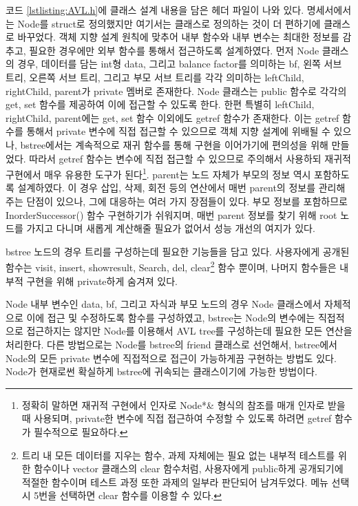 \documentclass{article}
\begin{document}
코드 \ref{lstlisting:AVL.h}에 클래스 설계 내용을 담은 헤더 파일이 나와 있다. 명세서에서는 Node를 struct로 정의했지만 여기서는 클래스로 정의하는 것이 더 편하기에 클래스로 바꾸었다. 객체 지향 설계 원칙에 맞추어 내부 함수와 내부 변수는 최대한 정보를 감추고, 필요한 경우에만 외부 함수를 통해서 접근하도록 설계하였다. 먼저 Node 클래스의 경우, 데이터를 담는 int형 data, 그리고 balance factor를 의미하는 bf, 왼쪽 서브 트리, 오른쪽 서브 트리, 그리고 부모 서브 트리를 각각 의미하는 leftChild, rightChild, parent가 private 멤버로 존재한다. Node 클래스는 public 함수로 각각의 get, set 함수를 제공하여 이에 접근할 수 있도록 한다. 한편 특별히 leftChild, rightChild, parent에는 get, set 함수 이외에도 getref 함수가 존재한다. 이는 getref 함수를 통해서 private 변수에 직접 접근할 수 있으므로 객체 지향 설계에 위배될 수 있으나, bstree에서는 계속적으로 재귀 함수를 통해 구현을 이어가기에 편의성을 위해 만들었다. 따라서 getref 함수는 변수에 직접 접근할 수 있으므로 주의해서 사용하되 재귀적 구현에서 매우 유용한 도구가 된다\footnote{정확히 말하면 재귀적 구현에서 인자로 Node*\& 형식의 참조를 매개 인자로 받을 때 사용되며, private한 변수에 직접 접근하여 수정할 수 있도록 하려면 getref 함수가 필수적으로 필요하다.}. parent는 노드 자체가 부모의 정보 역시 포함하도록 설계하였다. 이 경우 삽입, 삭제, 회전 등의 연산에서 매번 parent의 정보를 관리해주는 단점이 있으나, 그에 대응하는 여러 가지 장점들이 있다. 부모 정보를 포함하므로 InorderSuccessor() 함수 구현하기가 쉬워지며, 매번 parent 정보를 찾기 위해 root 노드를 가지고 다니며 새롭게 계산해줄 필요가 없어서 성능 개선의 여지가 있다.

bstree 노드의 경우 트리를 구성하는데 필요한 기능들을 담고 있다. 사용자에게 공개된 함수는 visit, insert, showresult, Search, del, clear\footnote{트리 내 모든 데이터를 지우는 함수, 과제 자체에는 필요 없는 내부적 테스트를 위한 함수이나 vector 클래스의 clear 함수처럼, 사용자에게 public하게 공개되기에 적절한 함수이며 테스트 과정 또한 과제의 일부라 판단되어 남겨두었다. 메뉴 선택 시 5번을 선택하면 clear 함수를 이용할 수 있다.} 함수 뿐이며, 나머지 함수들은 내부적 구현을 위해 private하게 숨겨져 있다.

Node 내부 변수인 data, bf, 그리고 자식과 부모 노드의 경우 Node 클래스에서 자체적으로 이에 접근 및 수정하도록 함수를 구성하였고, bstree는 Node의 변수에는 직접적으로 접근하지는 않지만 Node를 이용해서 AVL tree를 구성하는데 필요한 모든 연산을 처리한다. 다른 방법으로는 Node를 bstree의 friend 클래스로 선언해서, bstree에서 Node의 모든 private 변수에 직접적으로 접근이 가능하게끔 구현하는 방법도 있다. Node가 현재로썬 확실하게 bstree에 귀속되는 클래스이기에 가능한 방법이다.
\end{document}
